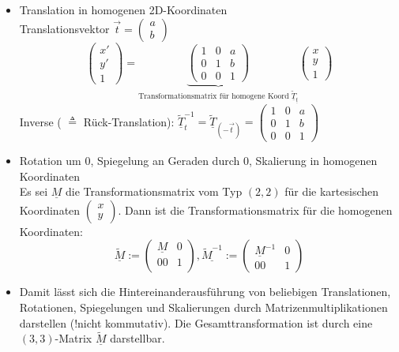 \documentclass[a4paper]{scrartcl}
\begin{document}
\begin{itemize}
\item Translation in homogenen 2D-Koordinaten\\
Translationsvektor $\vec{t} = \begin{pmatrix} a \\b \end{pmatrix}$
\begin{equation}\label{HomoTrans}
\begin{pmatrix} x' \\ y' \\ 1\end{pmatrix} = \underbrace{\begin{pmatrix} 1 & 0 & a\\ 0 & 1 & b\\ 0 & 0 & 1 \end{pmatrix}}_{\text{Transformationsmatrix für homogene Koord } \underline{\tilde{T}}_{\underline{t}}} \begin{pmatrix} x \\ y \\ 1\end{pmatrix}
\end{equation}
Inverse ( $\triangleq$ Rück-Translation): $\underline{\tilde{T}}_t^{-1} = \underline{\tilde{T}}_{(-\vec{t})} = \begin{pmatrix} 1 & 0 & a\\ 0 & 1 & b\\ 0 & 0 & 1 \end{pmatrix}$
\item Rotation um $0$, Spiegelung an Geraden durch $0$, Skalierung in homogenen Koordinaten\\
Es sei $\underline{M}$ die Transformationsmatrix vom Typ $(2,2)$ für die kartesischen Koordinaten $\begin{pmatrix} x \\y \end{pmatrix}$. Dann ist die Transformationsmatrix für die homogenen Koordinaten:
\[ \underline{\tilde{M}} := \left( \begin{array}{c|c} \underline{M} & 0 \\ \hline 00 & 1\\ \end{array} \right) , \underline{\tilde{M}^{-1}} := \left( \begin{array}{c|c} \underline{M}^{-1} & 0 \\ \hline 00 & 1\end{array} \right) \]
\item Damit lässt sich die Hintereinanderausführung von beliebigen Translationen, Rotationen, Spiegelungen und Skalierungen durch Matrizenmultiplikationen darstellen (!nicht kommutativ). Die Gesamttransformation ist durch eine $(3,3)$-Matrix $\underline{\tilde{M}}$ darstellbar.

\end{itemize}
\end{document}
